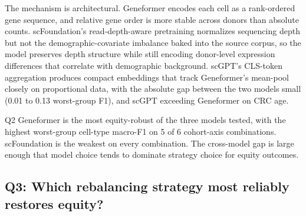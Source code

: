 \documentclass[sigconf]{acmart}
\begin{document}
The mechanism is architectural. Geneformer encodes each cell as a rank-ordered gene sequence, and relative gene order is more stable across donors than absolute counts. scFoundation's read-depth-aware pretraining normalizes sequencing depth but not the demographic-covariate imbalance baked into the source corpus, so the model preserves depth structure while still encoding donor-level expression differences that correlate with demographic background. scGPT's CLS-token aggregation produces compact embeddings that track Geneformer's mean-pool closely on proportional data, with the absolute gap between the two models small (0.01 to 0.13 worst-group F1), and scGPT exceeding Geneformer on CRC age.

\begin{answerbox}{Q2}
Geneformer is the most equity-robust of the three models tested, with the highest worst-group cell-type macro-F1 on 5 of 6 cohort-axis combinations. scFoundation is the weakest on every combination. The cross-model gap is large enough that model choice tends to dominate strategy choice for equity outcomes.
\end{answerbox}

\subsection{Q3: Which rebalancing strategy most reliably restores equity?}
\label{sec:q3}
\end{document}
